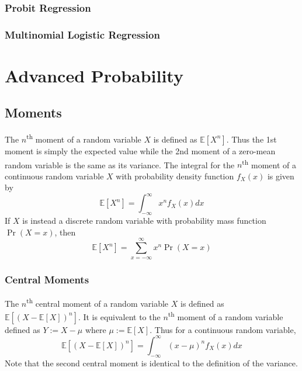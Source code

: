 \documentclass[11pt]{report} %
\begin{document}
\subsection{Probit Regression}

\subsection{Multinomial Logistic Regression}

\chapter{Advanced Probability}

\section{Moments}

The $n$\textsuperscript{th} moment of a random variable $X$ is defined as $\mathbb{E}\left[X^{n}\right]$. Thus the 1st moment is simply the expected value while the 2nd moment of a zero-mean random variable is the same as its variance. The integral for the $n$\textsuperscript{th} moment of a continuous random variable $X$ with probability density function $f_{X}\left(x\right)$ is given by
\begin{equation}
\mathbb{E}\left[X^{n}\right] = \int_{-\infty}^{\infty}x^{n}f_{X}\left(x\right)dx
\end{equation}
If $X$ is instead a discrete random variable with probability mass function $\operatorname{Pr}\left(X = x\right)$, then
\begin{equation}
\mathbb{E}\left[X^{n}\right] = \sum_{x = -\infty}^{\infty}x^{n}\operatorname{Pr}\left(X = x\right)
\end{equation}

\subsection{Central Moments}

The $n$\textsuperscript{th} central moment of a random variable $X$ is defined as $\mathbb{E}\left[\left(X - \mathbb{E}\left[X\right]\right)^{n}\right]$. It is equivalent to the $n$\textsuperscript{th} moment of a random variable defined as $Y := X - \mu$ where $\mu := \mathbb{E}\left[X\right]$. Thus for a continuous random variable,
\begin{equation}
\mathbb{E}\left[\left(X - \mathbb{E}\left[X\right]\right)^{n}\right] = \int_{-\infty}^{\infty}\left(x - \mu\right)^{n}f_{X}\left(x\right)dx
\end{equation}
Note that the second central moment is identical to the definition of the variance.
\end{document}
